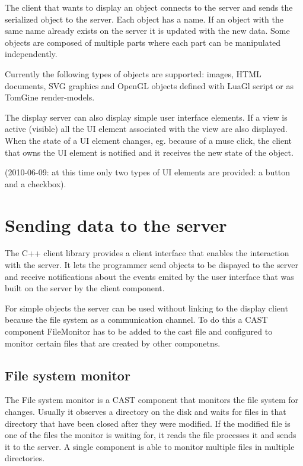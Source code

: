 The client that wants to display an object connects to the server and sends the
serialized object to the server. Each object has a name. If an object with the
same name already exists on the server it is updated with the new data. Some
objects are composed of multiple parts where each part can be manipulated
independently.

Currently the following types of objects are supported: images, HTML documents,
SVG graphics and OpenGL objects defined with LuaGl script or as TomGine
render-models. 

The display server can also display simple user interface elements. If a view
is active (visible) all the UI element associated with the view are also
displayed. When the state of a UI element changes, eg.  because of a muse
click, the client that owns the UI element is notified and it receives the new
state of the object.

(2010-06-09: at this time only two types of UI elements are provided: a button
and a checkbox).

\section{Sending data to the server}

The C++ client library provides a client interface that enables the interaction
with the server. It lets the programmer send objects to be dispayed to the
server and receive notifications about the events emited by the user interface
that was built on the server by the client component.

For simple objects the server can be used without linking to the display client
because the file system as a communication channel. To do this a CAST
component FileMonitor has to be added to the cast file and configured to
monitor certain files that are created by other componetns.

\subsection{File system monitor}

The File system monitor is a CAST component that monitors the file system for
changes. Usually it observes a directory on the disk and waits for files in that
directory that have been closed after they were modified. If the modified file
is one of the files the monitor is waiting for, it reads the file processes it
and sends it to the server. A single component is able to monitor multiple files
in multiple directories.

